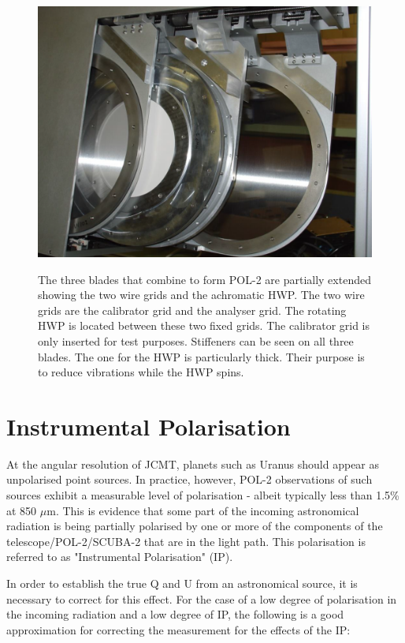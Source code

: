 \begin{figure}[t!]
\begin{center}
\includegraphics[width=0.7\linewidth]{pol2-three-components.png}
\label{fig:pol2components}
\caption [POL-2 components]{
  The three blades that combine to form POL-2 are partially
  extended showing the two wire grids and the achromatic HWP.
  The two wire grids are the calibrator grid and the analyser grid.
  The rotating HWP is located between these two fixed grids.
  The calibrator grid is only inserted for test purposes.
  Stiffeners can be seen on all three blades. The one for the HWP
  is particularly thick. Their purpose is to reduce vibrations while
  the HWP spins.
}
\end{center}
\end{figure}




\section{Instrumental Polarisation}
\label{sec:ip}

At the angular resolution of JCMT, planets such as Uranus should
appear as unpolarised point sources.  In practice, however, POL-2
observations of such sources exhibit a measurable level of
polarisation - albeit typically less than 1.5\% at 850 $\mu$m. This
is evidence that some part of the incoming astronomical radiation is
being partially polarised by one or more of the components of the
telescope/POL-2/SCUBA-2 that are in the light path. This polarisation
is referred to as "Instrumental Polarisation" (IP).

In order to establish the true Q and U from an astronomical source, it
is necessary to correct for this effect. For the case of a low degree
of polarisation in the incoming radiation and a low degree of IP, the
following is a good approximation for correcting the measurement for
the effects of the IP:

